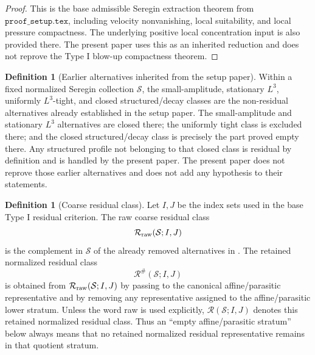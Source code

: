 \documentclass[11pt]{amsart}
\numberwithin{equation}{section}
\theoremstyle{plain}
\theoremstyle{definition}
\newtheorem{definition}[theorem]{Definition}
\theoremstyle{remark}
\newcommand{\calS}{\mathcal S}
\newcommand{\calR}{\mathcal R}
\begin{document}
\begin{proof}
This is the base admissible Seregin extraction theorem from
\(\texttt{proof\_setup.tex}\), including velocity nonvanishing, local suitability,
and local pressure compactness.  The underlying positive local concentration
input is also provided there.  The present paper uses this as an inherited
reduction and does not reprove the Type I blow-up compactness theorem.
\end{proof}

\begin{definition}[Earlier alternatives inherited from the setup paper]
\label{hyp:previous-nonresidual}
Within a fixed normalized Seregin collection \(\calS\), the small-amplitude,
stationary \(L^3\), uniformly \(L^3\)-tight, and closed structured/decay
classes are the non-residual alternatives already established in the setup
paper.  The small-amplitude and stationary \(L^3\) alternatives are closed
there; the uniformly tight class is excluded there; and the closed structured/decay
class is precisely the part proved empty there.  Any structured profile not
belonging to that closed class is residual by definition and is handled by
the present paper.  The present paper does not reprove those earlier
alternatives and does not add any hypothesis to their statements.
\end{definition}

\begin{definition}[Coarse residual class]
\label{def:coarse-residual}
Let \(I,J\) be the index sets used in the base Type I residual
criterion.  The raw coarse residual class
\[
   \calR_{\rm raw}(\calS;I,J)
\]
is the complement in \(\calS\) of the already removed alternatives in
.  The retained normalized residual class
\[
   \calR^\#(\calS;I,J)
\]
is obtained from \(\calR_{\rm raw}(\calS;I,J)\) by passing to the canonical
affine/parasitic representative and by removing any representative assigned to
the affine/parasitic lower stratum.  Unless the word raw is used explicitly,
\(\calR(\calS;I,J)\) denotes this retained normalized residual class.  Thus an
``empty affine/parasitic stratum'' below always means that no retained
normalized residual representative remains in that quotient stratum.
\end{definition}
\end{document}
